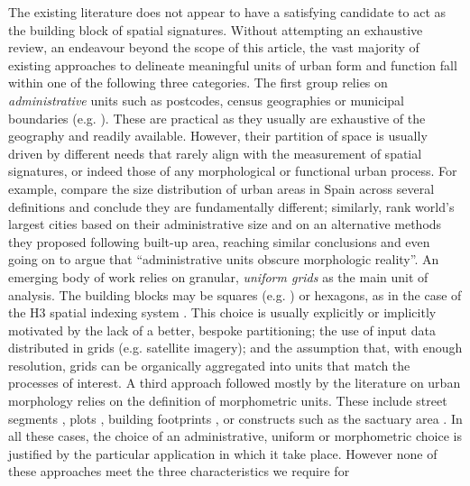 The existing literature does not appear to have a satisfying candidate to act
as the building block of spatial signatures.
%
Without attempting an exhaustive review, an endeavour beyond the scope of this
article, the vast majority of existing approaches to delineate meaningful
units of urban form and function fall within one of the following three
categories.
The first group relies on \textit{administrative} units such as postcodes, census geographies
or municipal boundaries (e.g. \citealp{taubenbock2020}).
%
These are practical as they usually are exhaustive of the geography and
readily available. However, their partition of space is usually driven by
different needs that rarely align with the measurement of spatial signatures,
or indeed those of any morphological or functional urban process. For example,
\cite{puente2020sensitive} compare the size distribution of urban areas in
Spain across several definitions and conclude they are fundamentally
different; similarly, \cite{taubenbock2019new} rank world's largest cities
based on their administrative size and on an alternative methods they proposed
following built-up area, reaching similar conclusions and even going on to
argue that ``administrative units obscure morphologic reality''.
An emerging body of work relies on granular, \textit{uniform grids} as the main unit of
analysis. The building blocks may be squares (e.g. \citealp{jochem2020}) or
hexagons, as in the case of the H3 spatial indexing system
\citep{brodsky2018h3}. This choice is usually explicitly or implicitly
motivated by the lack of a better, bespoke partitioning; the use of input data distributed
in grids (e.g. satellite imagery); and the assumption that, with enough
resolution, grids can be organically aggregated into units that match the
processes of interest.
A third approach followed mostly by the literature on urban morphology relies
on the definition of morphometric units. These include street segments
\citep{araldi2019}, plots \citep{bobkova2019}, building footprints \citep{schirmer2015}, or constructs such as the
sactuary area \citep{mehaffy2010urban,dibble2019origin}.
In all these cases, the choice of an administrative, uniform or morphometric
choice is justified by the particular application in which it take place.
However none of these approaches meet the three characteristics we require for
